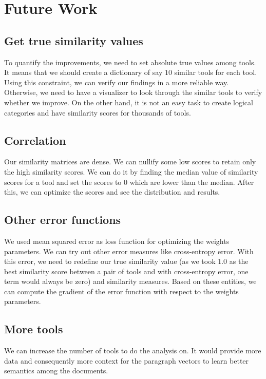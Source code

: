 \chapter{Future Work}

\section{Get true similarity values}
To quantify the improvements, we need to set absolute true values among tools. It means that we should create a dictionary of say $10$ similar tools for each tool. Using this constraint, we can verify our findings in a more reliable way. Otherwise, we need to have a visualizer to look through the similar tools to verify whether we improve. On the other hand, it is not an easy task to create logical categories and have similarity scores for thousands of tools.

\section{Correlation}
Our similarity matrices are dense. We can nullify some low scores to retain only the high similarity scores. We can do it by finding the median value of similarity scores for a tool and set the scores to $0$ which are lower than the median. After this, we can optimize the scores and see the distribution and results.

\section{Other error functions}
We used mean squared error as loss function for optimizing the weights parameters. We can try out other error measures like cross-entropy error. With this error, we need to redefine our true similarity value (as we took $1.0$ as the best similarity score between a pair of tools and with cross-entropy error, one term would always be zero) and similarity measures. Based on these entities, we can compute the gradient of the error function with respect to the weights parameters. 

\section{More tools}
We can increase the number of tools to do the analysis on. It would provide more data and consequently more context for the paragraph vectors to learn better semantics among the documents. 

